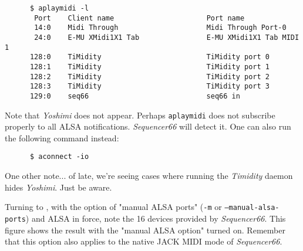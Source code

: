    \begin{verbatim}
      $ aplaymidi -l
       Port    Client name                      Port name
       14:0    Midi Through                     Midi Through Port-0
       24:0    E-MU XMidi1X1 Tab                E-MU XMidi1X1 Tab MIDI 1
      128:0    TiMidity                         TiMidity port 0
      128:1    TiMidity                         TiMidity port 1
      128:2    TiMidity                         TiMidity port 2
      128:3    TiMidity                         TiMidity port 3
      129:0    seq66                            seq66 in
   \end{verbatim}


   Note that \textsl{Yoshimi} does not appear.  Perhaps
   \texttt{aplaymidi} does not subscribe properly to all ALSA notifications.
   \textsl{Sequencer66} will detect it.
   One can also run the following command instead:

   \begin{verbatim}
      $ aconnect -io
   \end{verbatim}

   One other note... of late, we're seeing cases where running the
   \textsl{Timidity} daemon hides \textsl{Yoshimi}.  Just be aware.

%

   Turning to ,
   with the option of "manual ALSA ports" (\texttt{-m} or
   \texttt{--manual-alsa-ports}) and ALSA in force,
   note the 16 devices provided by \textsl{Sequencer66}.
   This figure shows the result with the "manual ALSA option" turned on.
   Remember that this option also applies to the native JACK MIDI
   mode of \textsl{Sequencer66}.


